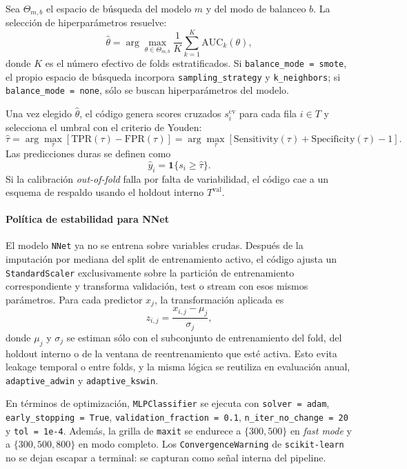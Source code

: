 Sea \(\Theta_{m,b}\) el espacio de b\'usqueda del modelo \(m\) y del modo de balanceo \(b\). La selecci\'on de hiperpar\'ametros resuelve:
\[
\hat{\theta}
=
\arg\max_{\theta \in \Theta_{m,b}}
\frac{1}{K}
\sum_{k=1}^{K}
\mathrm{AUC}_k(\theta),
\]
donde \(K\) es el n\'umero efectivo de folds estratificados. Si \texttt{balance\_mode = smote}, el propio espacio de b\'usqueda incorpora \texttt{sampling\_strategy} y \texttt{k\_neighbors}; si \texttt{balance\_mode = none}, s\'olo se buscan hiperpar\'ametros del modelo.

Una vez elegido \(\hat{\theta}\), el c\'odigo genera scores cruzados \(s_i^{\mathrm{cv}}\) para cada fila \(i \in T\) y selecciona el umbral con el criterio de Youden:
\[
\hat{\tau}
=
\arg\max_{\tau}
\left[
\mathrm{TPR}(\tau) - \mathrm{FPR}(\tau)
\right]
=
\arg\max_{\tau}
\left[
\mathrm{Sensitivity}(\tau) + \mathrm{Specificity}(\tau) - 1
\right].
\]
Las predicciones duras se definen como
\[
\hat{y}_i = \mathbf{1}\{s_i \ge \hat{\tau}\}.
\]
Si la calibraci\'on \textit{out-of-fold} falla por falta de variabilidad, el c\'odigo cae a un esquema de respaldo usando el holdout interno \(T^{\mathrm{val}}\).

\paragraph{Pol\'itica de estabilidad para NNet}
El modelo \texttt{NNet} ya no se entrena sobre variables crudas. Despu\'es de la imputaci\'on por mediana del split de entrenamiento activo, el c\'odigo ajusta un \texttt{StandardScaler} exclusivamente sobre la partici\'on de entrenamiento correspondiente y transforma validaci\'on, test o stream con esos mismos par\'ametros. Para cada predictor \(x_j\), la transformaci\'on aplicada es
\[
z_{i,j} = \frac{x_{i,j} - \mu_j}{\sigma_j},
\]
donde \(\mu_j\) y \(\sigma_j\) se estiman s\'olo con el subconjunto de entrenamiento del fold, del holdout interno o de la ventana de reentrenamiento que est\'e activa. Esto evita leakage temporal o entre folds, y la misma l\'ogica se reutiliza en evaluaci\'on anual, \texttt{adaptive\_adwin} y \texttt{adaptive\_kswin}.

En t\'erminos de optimizaci\'on, \texttt{MLPClassifier} se ejecuta con \texttt{solver = adam}, \texttt{early\_stopping = True}, \texttt{validation\_fraction = 0.1}, \texttt{n\_iter\_no\_change = 20} y \texttt{tol = 1e-4}. Adem\'as, la grilla de \texttt{maxit} se endurece a $\{300,500\}$ en \textit{fast mode} y a $\{300,500,800\}$ en modo completo. Los \texttt{ConvergenceWarning} de \texttt{scikit-learn} no se dejan escapar a terminal: se capturan como se\~nal interna del pipeline.

